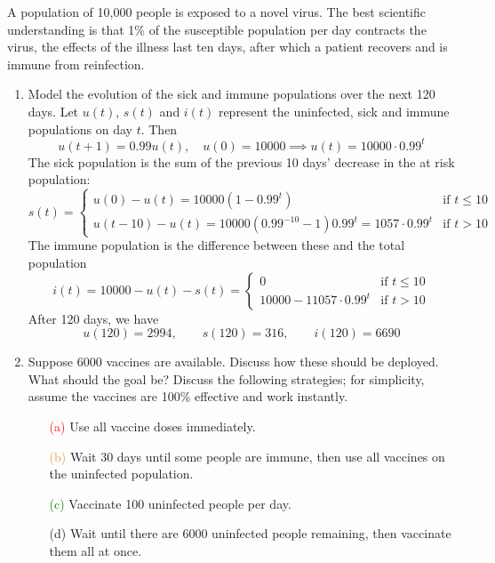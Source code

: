 \goodbreak



\label{pg:virus}

A population of 10,000 people is exposed to a novel virus. The best scientific understanding is that 1\% of the susceptible population per day contracts the virus, the effects of the illness last ten days, after which a patient recovers and is immune from reinfection.
\begin{enumerate}
  \item Model the evolution of the sick and immune populations over the next 120 days.\smallbreak
  Let $u(t)$, $s(t)$ and $i(t)$ represent the uninfected, sick and immune populations on day $t$. Then
	\[
		u(t+1)= 0.99u(t),\quad u(0)=10000\implies u(t)=10000\cdot 0.99^t
	\]
	The sick population is the sum of the previous 10 days' decrease in the at risk population:
	\[
		s(t)=
		\begin{cases}
			u(0)-u(t)=10000(1-0.99^t)&\text{if }t\le 10\\
			u(t-10)-u(t)=10000(0.99^{-10}-1)0.99^t=1057\cdot 0.99^t&\text{if }t> 10
		\end{cases}
	\]
	The immune population is the difference between these and the total population
	\[
		i(t)=10000-u(t)-s(t)=
		\begin{cases}
			0&\text{if }t\le 10\\
			10000-11057\cdot 0.99^t&\text{if }t> 10
		\end{cases}
	\]
	After 120 days, we have
	\[
		u(120)=2994,\qquad s(120)=316,\qquad i(120)=6690
	\]
  
  \item Suppose 6000 vaccines are available. Discuss how these should be deployed. What should the goal be? Discuss the following strategies; for simplicity, assume the vaccines are 100\% effective and work instantly.
  \begin{enumerate}
    \item[\textcolor{red}{(a)}] Use all vaccine doses immediately.
  	\item[\textcolor{Goldenrod}{(b)}] Wait 30 days until some people are immune, then use all vaccines on the uninfected population.
  	\item[\textcolor{Green}{(c)}] Vaccinate 100 uninfected people per day.
  	\item[(d)] Wait until there are 6000 uninfected people remaining, then vaccinate them all at once.
	\end{enumerate}
\end{enumerate}
